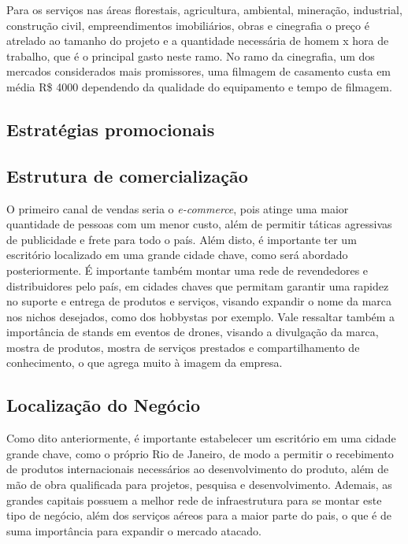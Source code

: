 Para os serviços nas áreas florestais, agricultura, ambiental, mineração, industrial, 
construção civil, empreendimentos imobiliários, obras e cinegrafia o preço é atrelado 
ao tamanho do projeto e a quantidade necessária de homem x hora de trabalho, que é o 
principal gasto neste ramo. No ramo da cinegrafia, um dos mercados considerados mais 
promissores, uma filmagem de casamento custa em média R\$ 4000 dependendo da qualidade 
do equipamento e tempo de filmagem.

\subsection{Estratégias promocionais}


\subsection{Estrutura de comercialização}


O primeiro canal de vendas seria o \emph{e-commerce}, pois atinge uma maior quantidade de 
pessoas com um menor custo, além de permitir táticas agressivas de publicidade e frete para todo o 
país. Além disto, é importante ter um escritório localizado em uma grande cidade chave, como 
será abordado posteriormente. É importante também montar uma rede de revendedores e distribuidores 
pelo país, em cidades chaves que permitam garantir uma rapidez no suporte e entrega de produtos 
e serviços, visando expandir o nome da marca nos nichos desejados, como dos hobbystas por exemplo. 
Vale ressaltar também a importância de stands em eventos de drones, visando a divulgação da marca, 
mostra de produtos, mostra de serviços prestados e compartilhamento de conhecimento, o 
que agrega muito à imagem da empresa.

\subsection{Localização do Negócio}


Como dito anteriormente, é importante estabelecer um escritório em uma cidade grande chave, 
como o próprio Rio de Janeiro, de modo a permitir o recebimento de produtos internacionais 
necessários ao desenvolvimento do produto, além de mão de obra qualificada para projetos, 
pesquisa e desenvolvimento. Ademais, as grandes capitais possuem a melhor rede de infraestrutura 
para se montar este tipo de negócio, além dos serviços aéreos para a maior parte do pais, o 
que é de suma importância para expandir o mercado atacado.
